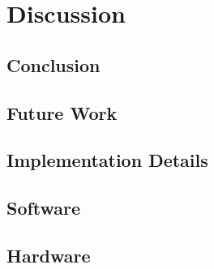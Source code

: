 \documentclass[a4paper,12pt,bibtotoc,titlepage, liststotoc,BCOR7mm,headsepline,pointlessnumbers]{scrbook}
\numberwithin{equation}{section}
\begin{document}
\chapter{Discussion}
\section{Conclusion}
\section{Future Work}

\clearpage
\begin{appendix}
\chapter{Implementation Details}
\section{Software}
\section{Hardware}
\end{appendix}


\end{document}
